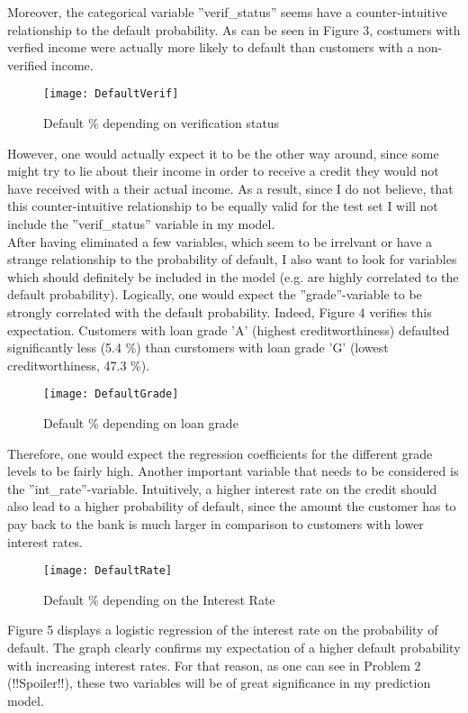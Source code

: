 \documentclass[11pt,a4paper,numbers=endperiod]{article}
\begin{document}
	Moreover, the categorical variable ''verif\_status'' seems have a counter-intuitive relationship to the default probability. As can be seen in Figure 3, costumers with verfied income were actually more likely to default than customers with a non-verified income.
	\begin{figure}[!ht]
		\centering
		\texttt{[image: DefaultVerif]}
		\caption{Default \% depending on verification status}
	\end{figure}
	However, one would actually expect it to be the other way around, since some might try to lie about their income in order to receive a credit they would not have received with a their actual income. As a result, since I do not believe, that this counter-intuitive relationship to be equally valid for the test set I will not include the ''verif\_status'' variable in my model.\\
	After having eliminated a few variables, which seem to be irrelvant or have a strange relationship to the probability of default, I also want to look for variables which should definitely be included in the model (e.g. are highly correlated to the default probability).  
 	Logically, one would expect the ''grade''-variable to be strongly correlated with the default probability. Indeed, Figure 4 verifies this expectation. Customers with loan grade 'A' (highest creditworthiness) defaulted significantly less (5.4 \%) than curstomers with loan grade 'G' (lowest creditworthiness, 47.3 \%).  
	\begin{figure}[!ht] 
		\centering
		\texttt{[image: DefaultGrade]}
		\caption{Default \% depending on loan grade}
	\end{figure}
	Therefore, one would expect the regression coefficients for the different grade levels to be fairly high. Another important variable that needs to be considered is the ''int\_rate''-variable. Intuitively, a higher interest rate on the credit should also lead to a higher probability of default, since the amount the customer has to pay back to the bank is much larger in comparison to customers with lower interest rates. 
	\begin{figure}[!ht]
		\centering
		\texttt{[image: DefaultRate]}
		\caption{Default \% depending on the Interest Rate}
	\end{figure}
	Figure 5 displays a logistic regression of the interest rate on the probability of default. The graph clearly confirms my expectation of a higher default probability with increasing interest rates. For that reason, as one can see in Problem 2 (!!Spoiler!!), these two variables will be of great significance in my prediction model. \newpage
	
\end{document}
